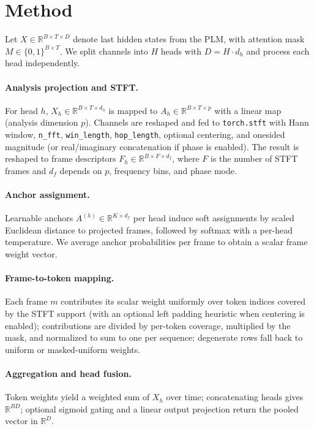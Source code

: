 \documentclass[11pt]{article}
\newcommand{\R}{\mathbb{R}}
\begin{document}
\section{Method}
Let $X\in\R^{B\times T\times D}$ denote last hidden states from the PLM, with attention mask $M\in\{0,1\}^{B\times T}$.
We split channels into $H$ heads with $D=H\cdot d_h$ and process each head independently.

\paragraph{Analysis projection and STFT.}
For head $h$, $X_h\in\R^{B\times T\times d_h}$ is mapped to $A_h\in\R^{B\times T\times p}$ with a linear map (analysis dimension $p$).
Channels are reshaped and fed to \texttt{torch.stft} with Hann window, \texttt{n\_fft}, \texttt{win\_length}, \texttt{hop\_length}, optional centering, and onesided magnitude (or real/imaginary concatenation if phase is enabled).
The result is reshaped to frame descriptors $F_h\in\R^{B\times F\times d_f}$, where $F$ is the number of STFT frames and $d_f$ depends on $p$, frequency bins, and phase mode.

\paragraph{Anchor assignment.}
Learnable anchors $A^{(h)}\in\R^{K\times d_f}$ per head induce soft assignments by scaled Euclidean distance to projected frames, followed by softmax with a per-head temperature.
We average anchor probabilities per frame to obtain a scalar frame weight vector.

\paragraph{Frame-to-token mapping.}
Each frame $m$ contributes its scalar weight uniformly over token indices covered by the STFT support (with an optional left padding heuristic when centering is enabled); contributions are divided by per-token coverage, multiplied by the mask, and normalized to sum to one per sequence; degenerate rows fall back to uniform or masked-uniform weights.

\paragraph{Aggregation and head fusion.}
Token weights yield a weighted sum of $X_h$ over time; concatenating heads gives $\R^{BD}$; optional sigmoid gating and a linear output projection return the pooled vector in $\R^{D}$.
\end{document}
